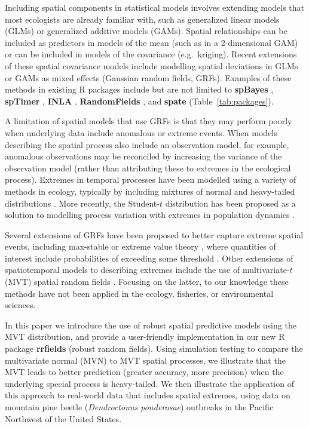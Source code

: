 \documentclass[12pt,english]{article}
\begin{document}
\begin{spacing}{1.9}
Including spatial components in statistical models involves extending models
that most ecologists are already familiar with, such as generalized linear
models (GLMs) or generalized additive models (GAMs). Spatial relationships can
be included as predictors in models of the mean (such as in a 2-dimensional
GAM) or can be included in models of the covariance (e.g.\ kriging). Recent
extensions of these spatial covariance models include modelling spatial
deviations in GLMs or GAMs as mixed effects (Gaussian random
fields, GRFs). Examples of these methods in existing R packages include but are not
limited to \textbf{spBayes} \citep{finley2007}, \textbf{spTimer}
\citep{bakar2015}, \textbf{INLA} \citep{rue2009}, \textbf{RandomFields}
\citep{schlather2016}, and \textbf{spate} \citep{sigrist2015}
(Table~\ref{tab:packages}).

A limitation of spatial models that use GRFs is that they
may perform poorly when underlying data include anomalous or extreme events.
When models describing the spatial process also include an observation model,
for example, anomalous observations may be reconciled by increasing the variance
of the observation model (rather than attributing these to extremes in the
ecological process). Extremes in temporal processes have been modelled using a
variety of methods in ecology, typically by including mixtures of normal and
heavy-tailed distributions \citep[e.g.][]{everitt1996, ward2007, thorson2011}.
More recently, the Student-$t$ distribution has been proposed as a
solution to modelling process variation with extremes in population dynamics
\citep{anderson2017}.

Several extensions of GRFs have been proposed to better capture
extreme spatial events, including max-stable or extreme value theory
\citep{davison2012, davison2012a}, where quantities of interest include probabilities
of exceeding some threshold \citep{davis2008}. Other extensions of spatiotemporal
models to describing extremes include the use of multivariate-$t$ (MVT) spatial
random fields \citep{roislien2007}. Focusing on the latter, to our knowledge these
methods have not been applied in the ecology, fisheries, or environmental sciences.

In this paper we introduce the use of robust spatial predictive models using
the MVT distribution, and provide a user-friendly implementation in our new
R package \textbf{rrfields} (robust random fields). Using simulation testing
to compare the multivariate normal (MVN) to MVT spatial processes, we
illustrate that the MVT leads to better prediction (greater accuracy, more
precision) when the underlying special process is heavy-tailed. We then
illustrate the application of this approach to real-world data that includes
spatial extremes, using data on mountain pine beetle (\textit{Dendroctonus
  ponderosae}) outbreaks in the Pacific Northwest of the United States.


\end{spacing}
\end{document}
